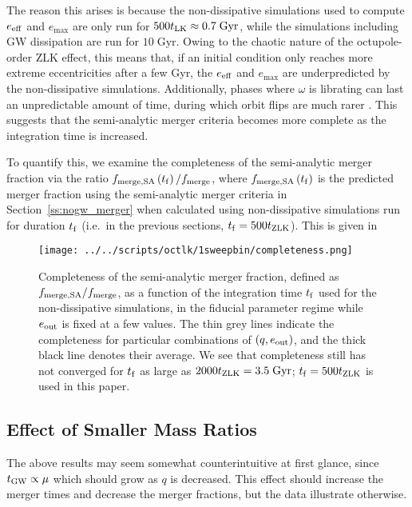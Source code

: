 \documentclass[
        fleqn,
        usenatbib,
    ]{mnras}
\newcommand*{\p}[1]{\left(#1\right)}
\newlength{\colummwidth}
\begin{document}
The reason this arises is because the non-dissipative simulations used to
compute $e_{\rm eff}$ and $e_{\max}$ are only run for $500 t_{\rm LK} \approx
0.7\;\mathrm{Gyr}$, while the simulations including GW dissipation are run for
$10\;\mathrm{Gyr}$. Owing to the chaotic nature of the octupole-order ZLK
effect, this means that, if an initial condition only reaches more extreme
eccentricities after a few Gyr, the $e_{\rm eff}$ and $e_{\max}$ are
underpredicted by the non-dissipative simulations. Additionally, phases where
$\omega$ is librating can last an unpredictable amount of time, during which
orbit flips are much rarer \citep{katz2011long}. This suggests that the
semi-analytic merger criteria becomes more complete as the integration
time is increased.

To quantify this, we examine the completeness of the semi-analytic merger
fraction via the ratio $f_{\rm merge, SA}\p{t_{\rm f}} / f_{\rm merge}$, where
$f_{\rm merge, SA}\p{t_{\rm f}}$ is the predicted merger fraction using the
semi-analytic merger criteria in Section~\ref{ss:nogw_merger} when calculated
using non-dissipative simulations run for duration $t_{\rm f}$ (i.e.\ in the
previous sections, $t_{\rm f} = 500t_{\rm ZLK}$). This is given in
\begin{figure}
    \centering
    \texttt{[image: ../../scripts/octlk/1sweepbin/completeness.png]}
    \caption{Completeness of the semi-analytic merger fraction, defined as
    $f_{\rm merge, SA} / f_{\rm merge}$, as a function of the integration time
    $t_{\rm f}$ used for the non-dissipative simulations, in the fiducial
    parameter regime while $e_{\rm out}$ is fixed at a few values. The thin grey
    lines indicate the completeness for particular combinations of $(q, e_{\rm
    out})$, and the thick black line denotes their average. We see that
    completeness still has not converged for $t_{\rm f}$ as large as $2000
    t_{\rm ZLK} = 3.5\;\mathrm{Gyr}$; $t_{\rm f} = 500t_{\rm ZLK}$ is used in
    this paper. }\label{fig:completeness}
\end{figure}

\subsection{Effect of Smaller Mass Ratios}

The above results may seem somewhat counterintuitive at first glance, since
$t_{\rm GW} \propto \mu$ which should grow as $q$ is decreased. This effect
should increase the merger times and decrease the merger fractions, but the data
illustrate otherwise.
\end{document}
